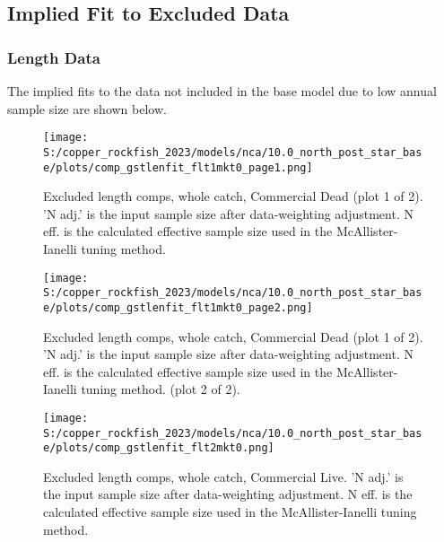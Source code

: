 \documentclass[11pt,
  letterpaper,
]{article}
\begin{document}
\subsection{Implied Fit to Excluded Data}\label{excluded-data}

\subsubsection{Length Data}\label{length-data-1}

The implied fits to the data not included in the base model due to low annual sample size are shown below.

\begin{figure}
{\centering
\texttt{[image: S:/copper\_rockfish\_2023/models/nca/10.0\_north\_post\_star\_base/plots/comp\_gstlenfit\_flt1mkt0\_page1.png]}
}
\caption{Excluded length comps, whole catch, Commercial Dead (plot 1 of 2).  'N adj.' is the input sample size after data-weighting adjustment. N eff. is the calculated effective sample size used in the McAllister-Ianelli tuning method.\label{fig:comp-gstlenfit-flt1mkt0-page1}}
\end{figure}

\begin{figure}
{\centering
\texttt{[image: S:/copper\_rockfish\_2023/models/nca/10.0\_north\_post\_star\_base/plots/comp\_gstlenfit\_flt1mkt0\_page2.png]}
}
\caption{Excluded length comps, whole catch, Commercial Dead (plot 1 of 2).  'N adj.' is the input sample size after data-weighting adjustment. N eff. is the calculated effective sample size used in the McAllister-Ianelli tuning method. (plot 2 of 2).\label{fig:comp-gstlenfit-flt1mkt0-page2}}
\end{figure}

\begin{figure}
{\centering
\texttt{[image: S:/copper\_rockfish\_2023/models/nca/10.0\_north\_post\_star\_base/plots/comp\_gstlenfit\_flt2mkt0.png]}
}
\caption{Excluded length comps, whole catch, Commercial Live.  'N adj.' is the input sample size after data-weighting adjustment. N eff. is the calculated effective sample size used in the McAllister-Ianelli tuning method.\label{fig:comp-gstlenfit-flt2mkt0}}
\end{figure}
\end{document}
